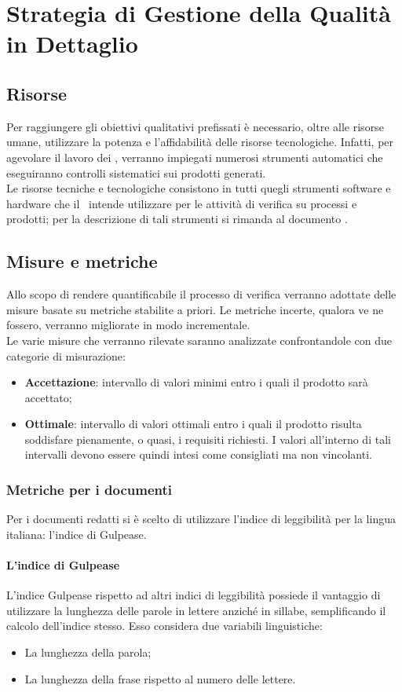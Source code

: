 \section{Strategia di Gestione della Qualità in Dettaglio}
\subsection{Risorse}
Per raggiungere gli obiettivi qualitativi prefissati è necessario, oltre alle risorse umane, utilizzare la potenza e l'affidabilità delle risorse tecnologiche. Infatti, per agevolare il lavoro dei \VerP, verranno impiegati numerosi strumenti automatici che eseguiranno controlli sistematici sui prodotti generati. \\
Le risorse tecniche e tecnologiche consistono in tutti quegli strumenti software e hardware che il \gruppo\ intende utilizzare per le attività di verifica su processi e prodotti; per la descrizione di tali strumenti si rimanda al documento \NdP.

\subsection{Misure e metriche}
Allo scopo di rendere quantificabile il processo di verifica verranno adottate delle misure basate su metriche stabilite a priori. Le metriche incerte, qualora ve ne fossero, verranno migliorate in modo incrementale. \\
Le varie misure che verranno rilevate saranno analizzate confrontandole con due categorie di misurazione:
\begin{itemize}
\item
\textbf{Accettazione}: intervallo di valori minimi entro i quali il prodotto sarà accettato;
\item
\textbf{Ottimale}: intervallo di valori ottimali entro i quali il prodotto risulta soddisfare pienamente, o quasi, i requisiti richiesti. I valori all'interno di tali intervalli devono essere quindi intesi come consigliati ma non vincolanti.
\end{itemize}

\subsubsection{Metriche per i documenti}
Per i documenti redatti si è scelto di utilizzare l'indice di leggibilità per la lingua italiana: l'indice di Gulpease.

\paragraph{L'indice di Gulpease}
L'indice Gulpease rispetto ad altri indici di leggibilità possiede il vantaggio di utilizzare la lunghezza delle parole in lettere anziché in sillabe, semplificando il calcolo dell'indice stesso. Esso considera due variabili linguistiche:
\begin{itemize}
\item La lunghezza della parola;
\item La lunghezza della frase rispetto al numero delle lettere.
\end{itemize}

